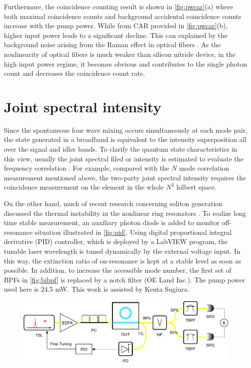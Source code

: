 Furthermore, the coincidence counting result is shown in \autoref{fig:pwcar}(a) where both maximal coincidence counts and background accidental coincidence counts increase with the pump power. While from CAR provided in \autoref{fig:pwcar}(b), higher input power leads to a significant decline. This can explained by the background noise arising from the Raman effect in optical fibers \cite{Engin2012, Sugiura2019}
. As the nonlinearity of optical fibers is much weaker than silicon nitride device, in the high input power regime, it becomes obvious and contributes to the single photon count and decreases the coincidence count rate.

\section{Joint spectral intensity}

Since the spontaneous four wave mixing occurs simultaneously at each mode pair, the state generated in a broadband is equivalent to the intensity superposition all over the signal and idler bands. To clarify the quantum state characteristics in this view, usually the joint spectral filed or intensity is estimated to evaluate the frequency correlation \cites{Helt2010,Vernon2015b}. For example, compared with the $ N $ mode correlation measurement mentioned above, the two-party joint spectral intensity requires the coincidence measurement on the element in the whole $ N^2 $ hilbert space.

On the other hand, much of recent research concerning soliton generation discussed the thermal instability in the nonlinear ring resonators \cites{Guo2017a,Herr2012}. 
To realize long time stable measurement, an auxiliary photon diode is added to monitor off-resonance situation illustrated in \autoref{fig:pid}. Using digital proportional integral derivative (PID) controller, which is deployed by a LabVIEW program, the tunable laser wavelength is tuned dynamically by the external voltage input. In this way, the extinction ratio of on-resonance is kept at a stable level as soon as possible. In addition, to increase the accessible mode number, the first set of BPFs in \autoref{fig:bibpf} is replaced by a notch filter (OE Land Inc.). The pump power used here is 24.5 mW. This work is assisted by Kenta Sugiura.

\begin{figure}
	\centering
	\includegraphics[width=1\linewidth]{imgs/pid.pdf}
	\label{fig:pid}
\end{figure}

